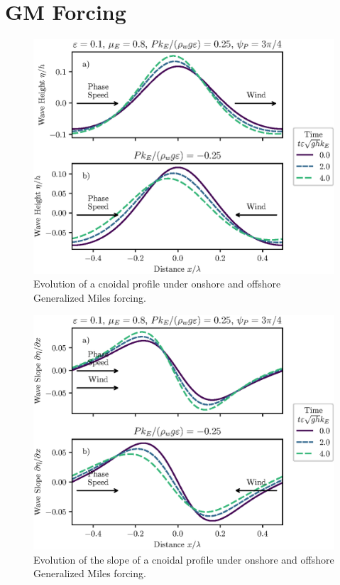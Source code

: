 \documentclass{jfm}
\let\Oldsection\section
\renewcommand{\section}{\FloatBarrier\Oldsection}
\begin{document}
\section{GM Forcing}
\begin{figure}
  \centering
  \includegraphics{Snapshots-Positive-Negative-Cnoidal-GM.eps}
  \caption{
    Evolution of a cnoidal profile under onshore and offshore Generalized
    Miles forcing.
  }
\end{figure}

\begin{figure}
  \centering
  \includegraphics{Slopes-Positive-Negative-Cnoidal-GM.eps}
  \caption{
    Evolution of the slope of a cnoidal profile under onshore and
    offshore Generalized Miles forcing.
  }
\end{figure}
\end{document}
